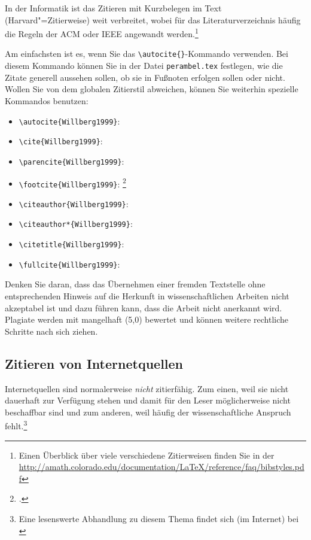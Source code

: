 In der Informatik ist das Zitieren mit Kurzbelegen im Text (Harvard"=Zitierweise) weit verbreitet, wobei für das Literaturverzeichnis häufig die Regeln der \acs{ACM} oder \acs{IEEE} angewandt werden.\footnote{Einen Überblick über viele verschiedene Zitierweisen finden Sie in der \url{http://amath.colorado.edu/documentation/LaTeX/reference/faq/bibstyles.pdf}}

Am einfachsten ist es, wenn Sie das \verb+\autocite{}+-Kommando verwenden. Bei diesem Kommando können Sie in der Datei \texttt{perambel.tex} festlegen, wie die Zitate generell aussehen sollen, \zb{} ob sie in Fußnoten erfolgen sollen oder nicht. Wollen Sie von dem globalen Zitierstil abweichen, können Sie weiterhin spezielle Kommandos benutzen:

\begin{itemize}
	\item \verb+\autocite{Willberg1999}+: \autocite{Willberg1999}
	\item \verb+\cite{Willberg1999}+: \cite{Willberg1999}
	\item \verb+\parencite{Willberg1999}+: \parencite{Willberg1999}
	\item \verb+\footcite{Willberg1999}+: \footcite{Willberg1999}
	\item \verb+\citeauthor{Willberg1999}+: \citeauthor{Willberg1999}
	\item \verb+\citeauthor*{Willberg1999}+: \citeauthor*{Willberg1999}
	\item \verb++: \citetitle{Willberg1999}
	\item \verb++: \fullcite{Willberg1999}
\end{itemize}

Denken Sie daran, dass das Übernehmen einer fremden Textstelle ohne entsprechenden Hinweis auf die Herkunft in wissenschaftlichen Arbeiten nicht akzeptabel ist und dazu führen kann, dass die Arbeit nicht anerkannt wird. Plagiate werden mit mangelhaft (5,0) bewertet und können weitere rechtliche Schritte nach sich ziehen.


\subsection{Zitieren von Internetquellen}

Internetquellen sind normalerweise \textit{nicht} zitierfähig. Zum einen, weil sie nicht dauerhaft zur Verfügung stehen und damit für den Leser möglicherweise nicht beschaffbar sind und zum anderen, weil häufig der wissenschaftliche Anspruch fehlt.\footnote{Eine lesenswerte Abhandlung zu diesem Thema findet sich (im Internet) bei \cite{Weber2006}}

